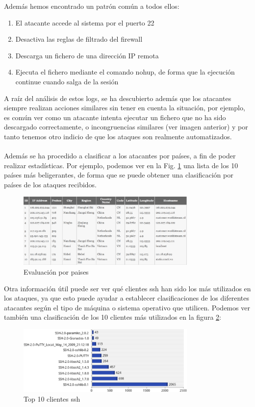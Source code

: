 \documentclass[journal]{IEEEtran}
\begin{document}
Además hemos encontrado un patrón común a todos ellos:
\begin{enumerate}
\item El atacante accede al sistema por el puerto 22
\item Desactiva las reglas de filtrado del firewall
\item Descarga un fichero de una dirección IP remota
\item Ejecuta el fichero mediante el comando nohup, de forma que la ejecución continue cuando salga de la sesión
\end{enumerate}
A raíz del análisis de estos logs, se ha descubierto además que los atacantes siempre realizan acciones similares sin tener en cuenta la situación, por ejemplo, es común ver como un atacante intenta ejecutar un fichero que no ha sido descargado correctamente, o incongruencias similares (ver imagen anterior) y por tanto tenemos otro indicio de que los ataques son realmente automatizados.
\\\\
Además se ha procedido a clasificar a los atacantes por países, a fin de poder realizar estadísticas. Por ejemplo, podemos ver en la Fig. \ref{fig:country_profiling} una lista de los 10 países más beligerantes, de forma que se puede obtener una clasificación por países de los ataques recibidos.
\begin{figure}[H]
\centerline{
\includegraphics[width=8.8cm]{img/country_profiling}
}
\caption{Evaluación por paises}
\label{fig:country_profiling}
\end{figure}
Otra información útil puede ser ver qué clientes ssh han sido los más utilizados en los ataques, ya que esto puede ayudar a establecer clasificaciones de los diferentes atacantes según el tipo de máquina o sistema operativo que utilicen. Podemos ver también una clasificación de los 10 clientes más utilizados en la figura \ref{fig:ssh}:
\begin{figure}[H]
\centerline{
\includegraphics[width=8.8cm]{img/ssh}
}
\caption{Top 10 clientes ssh }
\label{fig:ssh}
\end{figure}
\end{document}

